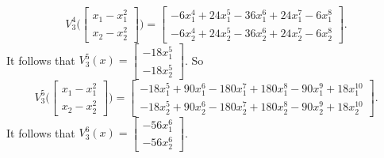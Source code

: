 \documentclass{article}
\theoremstyle{definition}
\begin{document}
\[
V_3^4\Big( \begin{bmatrix}x_1-x_1^2\\x_2-x_2^2\end{bmatrix}\Big)=
\begin{bmatrix}
-6x_1^4+24x_1^5-36x_1^6+24x_1^7-6x_1^8\\
-6x_2^4+24x_2^5-36x_2^6+24x_2^7-6x_2^8
\end{bmatrix}.
\]
It follows that $V_3^5(x)=\begin{bmatrix}-18x_1^5\\-18x_2^5\end{bmatrix}$. So
\[
V_3^5\Big( \begin{bmatrix}x_1-x_1^2\\x_2-x_2^2\end{bmatrix}\Big)=
\begin{bmatrix}
-18x_1^5+90x_1^6-180x_1^7+180x_1^8-90x_1^9+18x_1^{10}\\
-18x_2^5+90x_2^6-180x_2^7+180x_2^8-90x_2^9+18x_2^{10}
\end{bmatrix}.
\]
It follows that $V_3^6(x)=\begin{bmatrix}-56x_1^6\\-56x_2^6\end{bmatrix}$.
\end{document}
